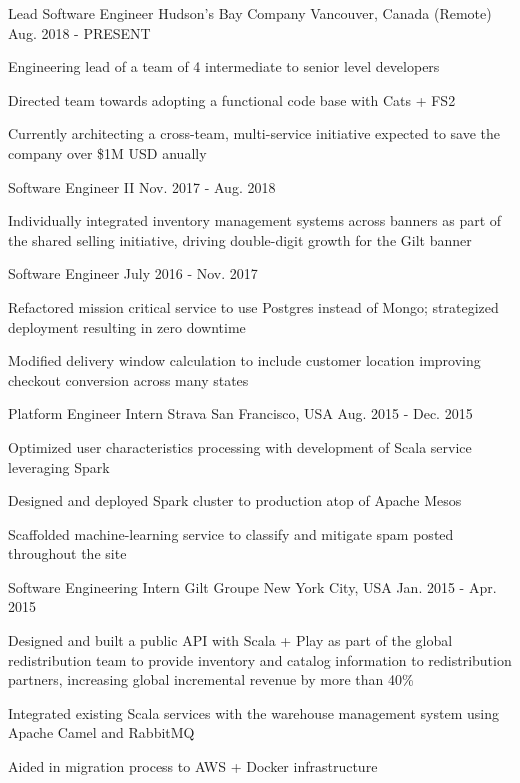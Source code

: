 \begin{cventries}
  \cventry
    {Lead Software Engineer}
    {Hudson's Bay Company}
    {Vancouver, Canada (Remote)}
    {Aug. 2018 - PRESENT}
    {
      \begin{cvitems}
        \item {Engineering lead of a team of 4 intermediate to senior level developers}
        \item {Directed team towards adopting a functional code base with Cats + FS2}
        \item {Currently architecting a cross-team, multi-service
            initiative expected to save the company over \$1M USD anually}
      \end{cvitems}
    }
  \cventry
    {Software Engineer II}
    {}
    {}
    {Nov. 2017 - Aug. 2018}
    {
      \begin{cvitems}
        \item {Individually integrated inventory management systems across banners as part of
            the shared selling initiative, driving double-digit growth for the Gilt banner}
      \end{cvitems}
    }
  \cventry
    {Software Engineer}
    {}
    {}
    {July 2016 - Nov. 2017}
    {
      \begin{cvitems}
        \item {Refactored mission critical service to use Postgres instead of Mongo; strategized deployment resulting in zero downtime}
        \item {Modified delivery window calculation to include customer location improving checkout conversion across many states}
      \end{cvitems}
    }
  \cventry
    {Platform Engineer Intern}
    {Strava}
    {San Francisco, USA}
    {Aug. 2015 - Dec. 2015}
    {
      \begin{cvitems}
        \item {Optimized user characteristics processing with development of Scala service leveraging Spark}
        \item {Designed and deployed Spark cluster to production atop of Apache Mesos}
        \item {Scaffolded machine-learning service to classify and mitigate spam posted throughout the site}
      \end{cvitems}
    }
  \cventry
    {Software Engineering Intern}
    {Gilt Groupe}
    {New York City, USA}
    {Jan. 2015 - Apr. 2015}
    {
      \begin{cvitems}
        \item {Designed and built a public API with Scala + Play as part of the global redistribution team to provide inventory and catalog information to redistribution partners, increasing global incremental revenue by more than 40\%}
        \item {Integrated existing Scala services with the warehouse management system using Apache Camel and RabbitMQ}
        \item {Aided in migration process to AWS + Docker infrastructure}
      \end{cvitems}
    }
\end{cventries}
